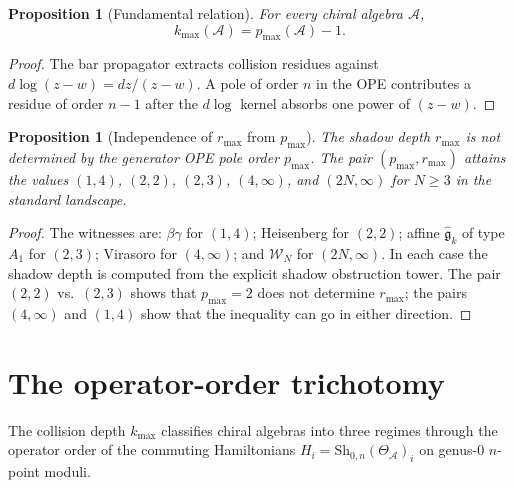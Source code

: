 \documentclass[11pt]{article}
\newtheorem{proposition}[theorem]{Proposition}
\theoremstyle{definition}
\theoremstyle{remark}
\newcommand{\cA}{\mathcal{A}}
\newcommand{\fg}{\mathfrak{g}}
\newcommand{\Walg}{\mathcal{W}}
\newcommand{\Sh}{\mathrm{Sh}}
\numberwithin{equation}{section}
\begin{document}
\begin{proposition}[Fundamental relation]\label{prop:k-from-p}
For every chiral algebra $\cA$,
\begin{equation}\label{eq:k-from-p}
k_{\max}(\cA) = p_{\max}(\cA) - 1.
\end{equation}
\end{proposition}

\begin{proof}
The bar propagator extracts collision residues against
$d\log(z-w) = dz/(z-w)$. A pole of order $n$ in the OPE contributes
a residue of order $n-1$ after the $d\log$ kernel absorbs one power
of $(z-w)$.
\end{proof}

\begin{proposition}[Independence of $r_{\max}$ from $p_{\max}$]
\label{prop:independence}
The shadow depth $r_{\max}$ is not determined by the generator OPE
pole order $p_{\max}$. The pair $(p_{\max}, r_{\max})$ attains
the values $(1,4)$, $(2,2)$, $(2,3)$, $(4,\infty)$, and
$(2N,\infty)$ for $N \geq 3$ in the standard landscape.
\end{proposition}

\begin{proof}
The witnesses are: $\beta\gamma$ for $(1,4)$; Heisenberg for $(2,2)$;
affine $\widehat{\fg}_k$ of type $A_1$ for $(2,3)$; Virasoro for
$(4,\infty)$; and $\Walg_N$ for $(2N, \infty)$. In each case the
shadow depth is computed from the explicit shadow obstruction tower.
The pair $(2,2)$ vs.\ $(2,3)$ shows that $p_{\max} = 2$ does not
determine $r_{\max}$; the pairs $(4,\infty)$ and $(1,4)$ show that
the inequality can go in either direction.
\end{proof}

\section{The operator-order trichotomy}\label{sec:trichotomy}

The collision depth $k_{\max}$ classifies chiral algebras into three
regimes through the operator order of the commuting Hamiltonians
$H_i = \Sh_{0,n}(\Theta_\cA)_i$ on genus-$0$ $n$-point moduli.
\end{document}
